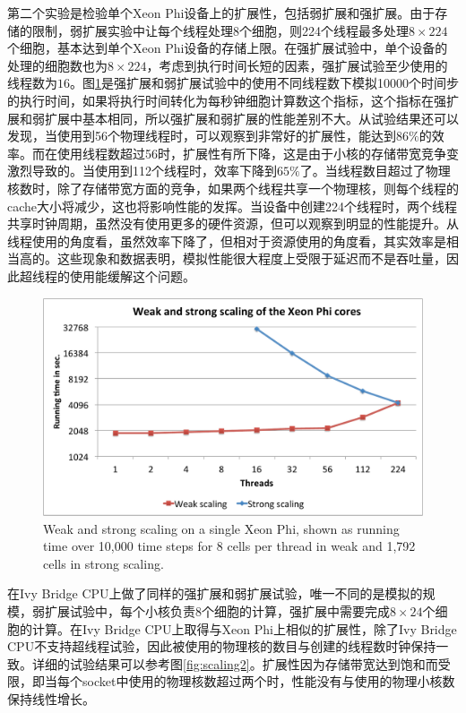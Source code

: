 第二个实验是检验单个Xeon Phi设备上的扩展性，包括弱扩展和强扩展。由于存储的限制，弱扩展实验中让每个线程处理8个细胞，则224个线程最多处理$8\times224$个细胞，基本达到单个Xeon Phi设备的存储上限。在强扩展试验中，单个设备的处理的细胞数也为$8\times224$，考虑到执行时间长短的因素，强扩展试验至少使用的线程数为$16$。图\ref{fig:scaling}是强扩展和弱扩展试验中的使用不同线程数下模拟10000个时间步的执行时间，如果将执行时间转化为每秒钟细胞计算数这个指标，这个指标在强扩展和弱扩展中基本相同，所以强扩展和弱扩展的性能差别不大。从试验结果还可以发现，当使用到56个物理线程时，可以观察到非常好的扩展性，能达到$86\%$的效率。而在使用线程数超过56时，扩展性有所下降，这是由于小核的存储带宽竞争变激烈导致的。当使用到112个线程时，效率下降到$65\%$了。当线程数目超过了物理核数时，除了存储带宽方面的竞争，如果两个线程共享一个物理核，则每个线程的cache大小将减少，这也将影响性能的发挥。当设备中创建224个线程时，两个线程共享时钟周期，虽然没有使用更多的硬件资源，但可以观察到明显的性能提升。从线程使用的角度看，虽然效率下降了，但相对于资源使用的角度看，其实效率是相当高的。这些现象和数据表明，模拟性能很大程度上受限于延迟而不是吞吐量，因此超线程的使用能缓解这个问题。

\begin{figure}[htb]
\includegraphics[width=\linewidth]{figs/weakstrongscalePHI.pdf}
\caption{Weak and strong scaling on a single Xeon Phi, shown as running time over 10,000 time steps for $8$ cells per thread in weak and 1,792 cells in strong scaling.}
\label{fig:scaling}
\end{figure}

在Ivy Bridge CPU上做了同样的强扩展和弱扩展试验，唯一不同的是模拟的规模，弱扩展试验中，每个小核负责8个细胞的计算，强扩展中需要完成$8\times24$个细胞的计算。在Ivy Bridge CPU上取得与Xeon Phi上相似的扩展性，除了Ivy Bridge CPU不支持超线程试验，因此被使用的物理核的数目与创建的线程数时钟保持一致。详细的试验结果可以参考图\ref{fig:scaling2}。扩展性因为存储带宽达到饱和而受限，即当每个socket中使用的物理核数超过两个时，性能没有与使用的物理小核数保持线性增长。

